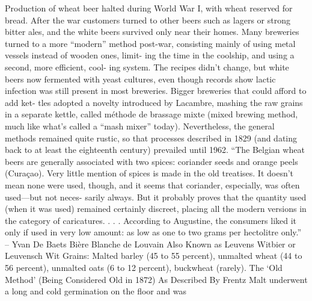 \documentclass[a4paper,parskip=half]{scrartcl}
\begin{document}
Production of wheat beer halted during World War I, with wheat
reserved for bread. After the war customers turned to other beers such
as lagers or strong bitter ales, and the white beers survived only near
their homes.
Many breweries turned to a more “modern” method post-war,
consisting mainly of using metal vessels instead of wooden ones, limit-
ing the time in the coolship, and using a second, more efficient, cool-
ing system. The recipes didn’t change, but white beers now fermented
with yeast cultures, even though records show lactic infection was still
present in most breweries. Bigger breweries that could afford to add ket-
tles adopted a novelty introduced by Lacambre, mashing the raw grains
in a separate kettle, called méthode de brassage mixte (mixed brewing
method, much like what’s called a “mash mixer” today). Nevertheless,
the general methods remained quite rustic, so that processes described
in 1829 (and dating back to at least the eighteenth century) prevailed
until 1962.
“The Belgian wheat beers are generally associated with two spices:
coriander seeds and orange peels (Curaçao). Very little mention of spices
is made in the old treatises. It doesn’t mean none were used, though,
and it seems that coriander, especially, was often used—but not neces-
sarily always. But it probably proves that the quantity used (when it
was used) remained certainly discreet, placing all the modern versions in
the category of caricatures. . . . According to Augustine, the consumers
liked it only if used in very low amount: as low as one to two grams per
hectolitre only.”
– Yvan De Baets
Bière Blanche de Louvain
Also Known as Leuvens Witbier or Leuvensch Wit
Grains: Malted barley (45 to 55 percent), unmalted wheat (44 to 56
percent), unmalted oats (6 to 12 percent), buckwheat (rarely).
The ‘Old Method’ (Being Considered Old in 1872)
As Described By Frentz
Malt underwent a long and cold germination on the floor and was

\parencite[41]{Hieronymus2010}
\end{document}
